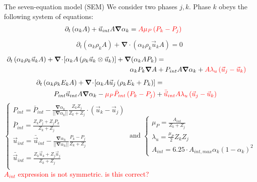 \documentclass[xcolor=dvipsnames,10pt]{beamer}
\renewcommand{\div}{\boldsymbol{\nabla}\! \cdot \!}
\newcommand{\grad}{\boldsymbol{\nabla}}
\newcommand{\tcr}[1]{\textcolor{red}{#1}}
\begin{document}
\begin{frame}{The seven-equation model (SEM)}
We consider two phases ${j,k}$. Phase $k$ obeys the following system of equations:
\begin{align}
&\partial_t \left( \alpha_k  A\right) + \vec{u}_{int} A \grad \alpha_k = {\color{red}A \mu_P \left( P_k - P_j \right)} \nonumber
\end{align}
\begin{align}
&\partial_t \left( \alpha_k \rho_k A \right) + \div \left( \alpha_k \rho_k \vec{u}_k A \right) = 0 \nonumber
\end{align}
\begin{align}
\partial_t \left( \alpha_k \rho_k \vec{u}_k A \right) + \div \left[ \alpha_k A \left( \rho_k \vec{u}_k\otimes \vec{u}_k \right) \right]  + \grad(\alpha_k A P_k) &=  \nonumber \\
\alpha_k P_k \grad A &+  P_{int} A \grad \alpha_k +  {\color{red}A \lambda_u \left( \vec{u}_j - \vec{u}_k \right)} \nonumber
\end{align}
\begin{align}
\partial_t \left( \alpha_k \rho_k E_k A \right) + \div \left[ \alpha_k A \vec{u}_j \left( \rho_k E_k + P_k \right) \right] &= \nonumber\\
P_{int} \vec{u}_{int} A \grad \alpha_k - {\color{red}\mu_P \bar{P}_{int} \left( P_k-P_j \right)} &+{\color{red}\bar{\vec{u}}_{int} A \lambda_u \left( \vec{u}_j - \vec{u}_k \right)} \nonumber
\end{align}
\begin{equation}
\left\{
\begin{array}{l}
P_{int} = \bar{P}_{int} - \frac{\grad \alpha_k}{||\grad \alpha_k||} \frac{Z_k Z_j}{Z_k + Z_j} \cdot \left( \vec{u}_k-\vec{u}_j \right) \\
\bar{P}_{int} = \frac{Z_k P_j + Z_j P_k}{Z_k + Z_j} \\
\vec{u}_{int} = \bar{\vec{u}}_{int} - \frac{\grad \alpha_k}{||\grad \alpha_k||} \frac{P_k - P_j}{Z_k + Z_j} \\
\bar{\vec{u}}_{int} = \frac{Z_k \vec{u} _k + Z_j \vec{u}_j}{Z_k + Z_j} \\
\end{array}
\right.
\nonumber
\text{ and }
\left\{
\begin{array}{l}
\mu_P = \frac{A_{int}}{Z_k+Z_j} \\
\lambda_u = \frac{\mu_P}{2} Z_k Z_j \\
A_{int} = 6.25 \cdot A_{int,max} \alpha_k \left( 1-\alpha_k \right)^2
\end{array}
\right.
\end{equation}
\tcr{$A_{int}$ expression is not symmetric. is this correct?}
\end{frame}
\end{document}
